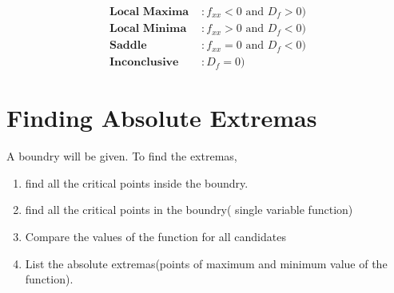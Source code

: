 \begin{align}
  \textbf{Local Maxima }&: f_{xx}<0 \text{ and } D_f
  >0)\label{eqn:local-maxima-2vf}\\
  \textbf{Local Minima }&: f_{xx}>0 \text{ and } D_f<0)
  \label{eqn:local-minima-2vf}\\
  \textbf{Saddle }&: f_{xx}=0 \text{ and } D_f<0) \label{eqn:saddle-2vf}\\
  \textbf{Inconclusive }&:  D_f=0) \label{eqn:inconclusive-2vf}
\end{align}

\section{Finding Absolute Extremas}
\label{sec:finding-absolute-extremas}
A boundry will be given. To find the extremas,
\begin{enumerate}
  \item find all the critical points inside the boundry.
  \item find all the critical points in the boundry( single variable function)
  \item Compare the values of the function for all candidates
  \item List the absolute extremas(points of maximum and minimum value of the
    function).
\end{enumerate}
